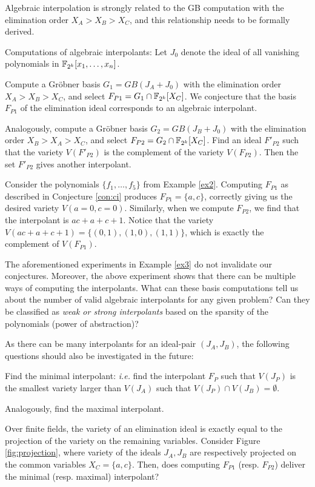 Algebraic interpolation is strongly related
to the GB computation with the elimination order $X_A>X_B>X_C$, and
this relationship needs to be formally derived. 

\begin{Conjecture} \label{con:ci}
Computations of algebraic interpolants: Let $J_0$ denote the ideal of
all vanishing polynomials in ${\mathbb{F}}_{2^k}[x_1,\dots,x_n]$.
\bi
\item  Compute a Gr\"obner basis $G_1 = GB(J_A + J_0)$ 
with the elimination order $X_A > X_B > X_C$, and select
$F_{P1}=G_1\cap{\mathbb{F}}_{2^k}[X_C]$. We conjecture that the \Grobner
basis $F_{P1}$ of the elimination ideal corresponds to an algebraic
interpolant. 

\item Analogously, compute a Gr\"obner basis $G_2 = GB(J_B + J_0)$ 
with the elimination order $X_B > X_A > X_C$, and select
$F_{P2}=G_2\cap{\mathbb{F}}_{2^k}[X_C]$. Find an ideal $F'_{P2}$ such that
the variety $V(F'_{P2})$ is the complement of the variety
$V(F_{P2})$. Then the set $F'_{P2}$ gives another interpolant.
\ei
\end{Conjecture}


\begin{Example}\label{ex3}
Consider the polynomials $\{f_1, \dots,f_5\}$ from Example
\ref{ex2}. Computing $F_{P1}$ as described in Conjecture \ref{con:ci} 
produces $F_{P1} = \{a, c\}$, correctly giving us the desired variety
$V(a = 0, c = 0)$. Similarly, when we compute $F_{P2}$, we find that
the interpolant is $ac + a + c + 1$. Notice that the variety 
$V(ac+a+c+1)=\{(0,1), (1,0), (1,1)\}$, which is exactly the complement
of $V(F_{P1})$.  
\end{Example}

The aforementioned experiments in Example \ref{ex3} do not invalidate
our conjectures. Moreover, the above experiment shows that there can be
multiple ways of computing the interpolants. What can these \Grobner
basis computations tell us about the number of valid algebraic
interpolants for any given problem? Can they be classified as {\it weak
  or strong interpolants} based on the sparsity of the polynomials
(power of abstraction)? 

As there can be many interpolants for an ideal-pair $(J_A, J_B)$, 
the following questions should also be investigated in the future:
\bi
\item Find the minimal interpolant: {\it i.e.} find the interpolant $F_P$
  such that $V(J_P)$ is the smallest variety larger than $V(J_A)$ such
  that $V(J_P) \cap V(J_B) = \emptyset$.
\item Analogously, find the maximal interpolant. 
\item Over finite fields, the variety of an elimination ideal is
  exactly equal to the projection of the variety on the remaining
  variables. Consider Figure \ref{fig:projection}, where variety of the
  ideals $J_A, J_B$ are respectively projected on the common variables
  $X_C = \{a, c\}$. Then, does computing $F_{P1}$ (resp. $F_{P2}$) 
  deliver the minimal (resp. maximal) interpolant?
\ei

